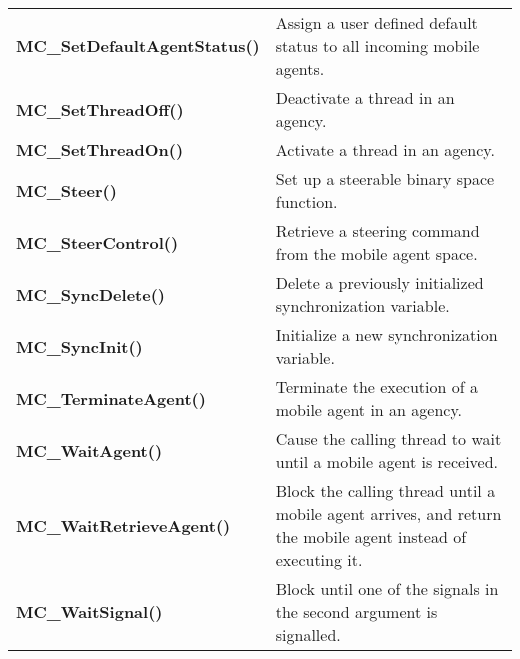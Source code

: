 \begin{table}[!hp]
\begin{center}
\begin{tabular}{p{63 mm}p{97 mm}}
{\bf MC\_SetDefaultAgentStatus()} \dotfill & Assign a user defined default status to all incoming mobile agents. \\
{\bf MC\_SetThreadOff()} \dotfill & Deactivate a thread in an agency. \\
{\bf MC\_SetThreadOn()} \dotfill & Activate a thread in an agency. \\
{\bf MC\_Steer()} \dotfill & Set up a steerable binary space function. \\
{\bf MC\_SteerControl()} \dotfill & Retrieve a steering command from the mobile agent space. \\
{\bf MC\_SyncDelete()} \dotfill & Delete a previously initialized synchronization variable. \\
{\bf MC\_SyncInit()} \dotfill & Initialize a new synchronization variable. \\
{\bf MC\_TerminateAgent()} \dotfill & Terminate the execution of a mobile agent in an agency. \\
{\bf MC\_WaitAgent()} \dotfill & Cause the calling thread to wait until a mobile agent is received. \\
{\bf MC\_WaitRetrieveAgent()} \dotfill & Block the calling thread until a mobile agent arrives, and return the mobile agent instead of executing it. \\
{\bf MC\_WaitSignal()} \dotfill & Block until one of the signals in the second argument is signalled.\\
\hline
\end{tabular}
\end{center}
\end{table}
\pagebreak

